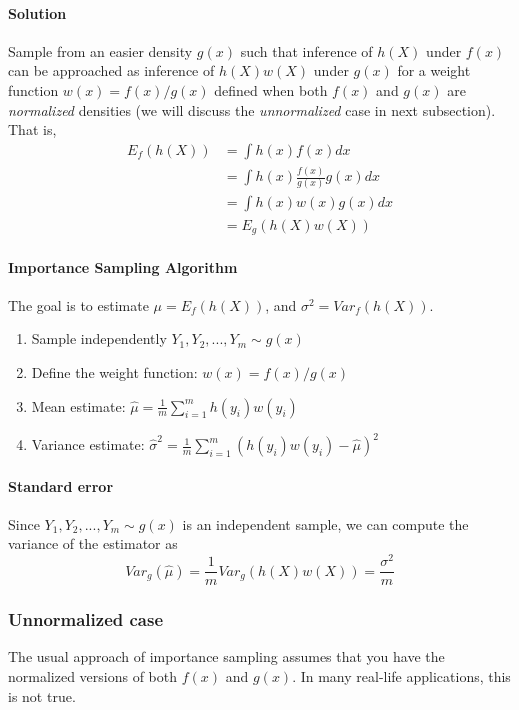 \documentclass[useAMS,usenatbib]{biom}
\begin{document}
\paragraph{Solution} Sample from an easier density $g(x)$ such that inference of $h(X)$ under $f(x)$ can be approached as
inference of $h(X)w(X)$ under $g(x)$ for a weight function
$w(x)=f(x)/g(x)$ defined when both $f(x)$ and $g(x)$ are \textit{normalized} densities (we will discuss the
    \textit{unnormalized} case in next subsection). That is,
\begin{eqnarray*}
E_f(h(X)) &= \int h(x) f(x) dx \\
&= \int h(x) \frac{f(x)}{g(x)} g(x) dx \\
&= \int h(x) w(x) g(x) dx \\
&= E_g(h(X)w(X))
\end{eqnarray*}

\paragraph{Importance Sampling Algorithm} The goal is to estimate
$\mu = E_f(h(X))$, and $\sigma^2 = Var_f(h(X))$.
\begin{enumerate}
\item{Sample independently $Y_1,Y_2,...,Y_m \sim g(x)$}
\item{Define the weight function: $w(x) = f(x)/g(x)$}
\item{Mean estimate: $\hat{\mu} = \frac{1}{m} \sum_{i=1}^m
    h(y_i)w(y_i)$}
\item{Variance estimate: $\hat{\sigma}^2 = \frac{1}{m} \sum_{i=1}^m
    (h(y_i)w(y_i) - \hat{\mu})^2$}
\end{enumerate}


\paragraph{Standard error}
Since $Y_1,Y_2,...,Y_m \sim g(x)$ is an independent sample, we can
compute the variance of the estimator as
\begin{equation}
Var_g(\hat{\mu}) = \frac{1}{m} Var_g(h(X)w(X)) = \frac{\sigma^2}{m}
\end{equation}

\subsubsection{Unnormalized case}
The usual approach of importance sampling assumes that you have the
normalized versions of both $f(x)$ and $g(x)$. In many real-life
applications, this is not true.
\end{document}
